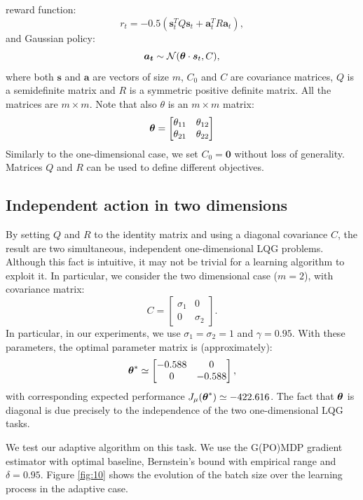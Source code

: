 reward function:
\[
	r_t=-0.5(\boldsymbol{s}_t^TQ\boldsymbol{s}_t + \boldsymbol{a}_t^TR\boldsymbol{a}_t),
\]
and Gaussian policy:
\[
	\boldsymbol{a_t} \sim \mathcal{N}(\boldsymbol{\theta} \cdot \boldsymbol{s}_t,C),
\]
where both $\boldsymbol{s}$ and $\boldsymbol{a}$ are vectors of size $m$, $C_0$ and $C$ are covariance matrices, $Q$ is a semidefinite matrix and $R$ is a symmetric positive definite matrix. All the matrices are $m\times m$. Note that also $\theta$ is an $m \times m$ matrix:
\[
\boldsymbol{\theta} = \begin{bmatrix}
\theta_{11} & \theta_{12} \\
\theta_{21} & \theta_{22}
\end{bmatrix}
\]
Similarly to the one-dimensional case, we set $C_0=\boldsymbol{0}$ without loss of generality. Matrices $Q$ and $R$ can be used to define different objectives.

\subsection{Independent action in two dimensions}
By setting $Q$ and $R$ to the identity matrix and using a diagonal covariance $C$, the result are two simultaneous, independent one-dimensional \ac{LQG} problems. Although this fact is intuitive, it may not be trivial for a learning algorithm to exploit it. In particular, we consider the two dimensional case ($m=2$), with covariance matrix:
\[
	C = 
	\begin{bmatrix}
	\sigma_1 & 0 		\\
	0		 & \sigma_2
	\end{bmatrix}.
\]
In particular, in our experiments, we use $\sigma_1 = \sigma_2 = 1$ and $\gamma = 0.95$. With these parameters, the optimal parameter matrix is (approximately):
\[
	\boldsymbol{\theta}^* \simeq 
	\begin{bmatrix}
	-0.588 & 0 		\\
	0		 & -0.588
	\end{bmatrix},
\]
with corresponding expected performance $J_\mu(\boldsymbol{\theta}^*) \simeq -422.616$. The fact that $\boldsymbol{\theta}$ is diagonal is due precisely to the independence of the two one-dimensional \ac{LQG} tasks.

We test our adaptive algorithm on this task. We use the G(PO)MDP gradient estimator with optimal baseline, Bernstein's bound with empirical range and $\delta=0.95$.
Figure \ref{fig:10} shows the evolution of the batch size over the learning process in the adaptive case.

